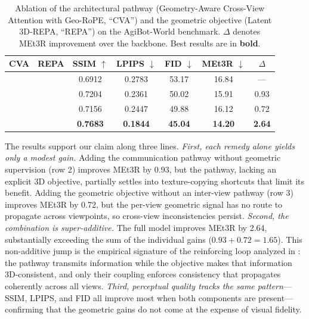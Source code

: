 \begin{table}[t]
	\centering
	\small
	\caption{Ablation of the architectural pathway (Geometry-Aware Cross-View Attention with Geo-RoPE, ``CVA'') and the geometric objective (Latent 3D-REPA, ``REPA'') on the AgiBot-World benchmark. $\Delta$ denotes MEt3R improvement over the backbone. Best results are in \textbf{bold}.}
	\label{tab:ablation}
	\renewcommand{\arraystretch}{1.2}
	\begin{tabular}{cc cccc c}
		\toprule
		CVA & REPA & SSIM $\uparrow$ & LPIPS $\downarrow$ & FID $\downarrow$ & MEt3R $\downarrow$ & $\Delta$ \\
		\midrule
		\xmark & \xmark & 0.6912 & 0.2783 & 53.17 & 16.84 & --- \\
		\cmark & \xmark & 0.7204 & 0.2361 & 50.02 & 15.91 & 0.93 \\
		\xmark & \cmark & 0.7156 & 0.2447 & 49.88 & 16.12 & 0.72 \\
		\cmark & \cmark & \textbf{0.7683} & \textbf{0.1844} & \textbf{45.04} & \textbf{14.20} & \textbf{2.64} \\
		\bottomrule
	\end{tabular}
\end{table}

The results support our claim along three lines. \emph{First, each remedy alone yields only a modest gain.} Adding the communication pathway without geometric supervision (row 2) improves MEt3R by 0.93, but the pathway, lacking an explicit 3D objective, partially settles into texture-copying shortcuts that limit its benefit. Adding the geometric objective without an inter-view pathway (row 3) improves MEt3R by 0.72, but the per-view geometric signal has no route to propagate across viewpoints, so cross-view inconsistencies persist. \emph{Second, the combination is super-additive.} The full model improves MEt3R by 2.64, substantially exceeding the sum of the individual gains ($0.93 + 0.72 = 1.65$). This non-additive jump is the empirical signature of the reinforcing loop analyzed in : the pathway transmits information while the objective makes that information 3D-consistent, and only their coupling enforces consistency that propagates coherently across all views. \emph{Third, perceptual quality tracks the same pattern}---SSIM, LPIPS, and FID all improve most when both components are present---confirming that the geometric gains do not come at the expense of visual fidelity.
